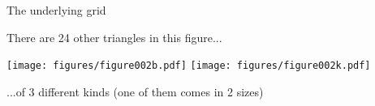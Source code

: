 \documentclass[14pt]{beamer}
\begin{document}

    \begin{frame}{The underlying grid}
        \begin{center}
            There are 24 other triangles in this figure...

            \bigskip \bigskip

            \texttt{[image: figures/figure002b.pdf]}\qquad
            \texttt{[image: figures/figure002k.pdf]}\\[-0.1ex]

            \bigskip \bigskip

            ...of 3 different kinds (one of them comes in 2 sizes)
        \end{center}
    \end{frame}

\end{document}
